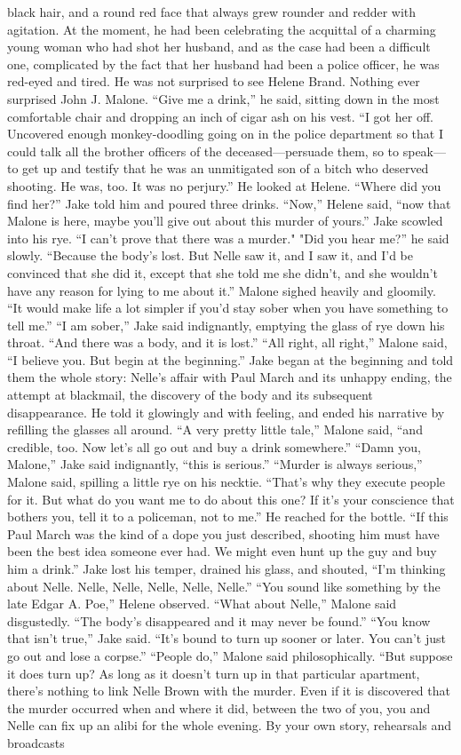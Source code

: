 \documentclass{novel}
\begin{document}
black hair, and a round red face that always grew rounder and redder with agitation. At the moment, he had been celebrating the acquittal of a charming young woman who had shot her husband, and as the case had been a difficult one, complicated by the fact that her husband had been a police officer, he was red-eyed and tired. He was not surprised to see Helene Brand. Nothing ever surprised John J. Malone. “Give me a drink,” he said, sitting down in the most comfortable chair and dropping an inch of cigar ash on his vest. “I got her off. Uncovered enough monkey-doodling going on in the police department so that I could talk all the brother officers of the deceased—persuade them, so to speak—to get up and testify that he was an unmitigated son of a bitch who deserved shooting. He was, too. It was no perjury.” He looked at Helene. “Where did you find her?” Jake told him and poured three drinks. “Now,” Helene said, “now that Malone is here, maybe you’ll give out about this murder of yours.” Jake scowled into his rye. “I can’t prove that there was a murder." "Did you hear me?” he said slowly. “Because the body’s lost. But Nelle saw it, and I saw it, and I'd be convinced that she did it, except that she told me she didn’t, and she wouldn’t have any reason for lying to me about it.” Malone sighed heavily and gloomily. “It would make life a lot simpler if you’d stay sober when you have something to tell me.” “I am sober,” Jake said indignantly, emptying the glass of rye down his throat. “And there was a body, and it is lost.” “All right, all right,” Malone said, “I believe you. But begin at the beginning.” Jake began at the beginning and told them the whole story: Nelle’s affair with Paul March and its unhappy ending, the attempt at blackmail, the discovery of the body and its subsequent disappearance. He told it glowingly and with feeling, and ended his narrative by refilling the glasses all around. “A very pretty little tale,” Malone said, “and credible, too. Now let’s all go out and buy a drink somewhere.” “Damn you, Malone,” Jake said indignantly, “this is serious.” “Murder is always serious,” Malone said, spilling a little rye on his necktie. “That’s why they execute people for it. But what do you want me to do about this one? If it’s your conscience that bothers you, tell it to a policeman, not to me.” He reached for the bottle. “If this Paul March was the kind of a dope you just described, shooting him must have been the best idea someone ever had. We might even hunt up the guy and buy him a drink.” Jake lost his temper, drained his glass, and shouted, “I’m thinking about Nelle. Nelle, Nelle, Nelle, Nelle, Nelle.” “You sound like something by the late Edgar A. Poe,” Helene observed. “What about Nelle,” Malone said disgustedly. “The body’s disappeared and it may never be found.” “You know that isn’t true,” Jake said. “It’s bound to turn up sooner or later. You can’t just go out and lose a corpse.” “People do,” Malone said philosophically. “But suppose it does turn up? As long as it doesn’t turn up in that particular apartment, there’s nothing to link Nelle Brown with the murder. Even if it is discovered that the murder occurred when and where it did, between the two of you, you and Nelle can fix up an alibi for the whole evening. By your own story, rehearsals and broadcasts 
\end{document}
